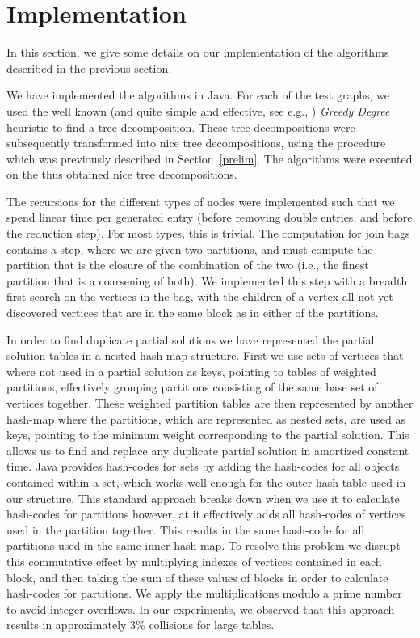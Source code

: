 \documentclass{llncs}
\begin{document}
\section{Implementation}
\label{section:experiments}
In this section, we give some details on our implementation of the algorithms described in the previous section.

We have implemented the algorithms in Java. For each of the test graphs, we used the well known (and quite simple and effective, see e.g., \cite{BodlaenderK10}) {\em Greedy Degree} 
heuristic to find a tree decomposition. These tree decompositions were subsequently transformed into nice tree decompositions,
using the procedure which was previously described in Section~\ref{prelim}. The algorithms were executed on the thus obtained nice tree decompositions.

The recursions for the different types of nodes were implemented such that we spend linear time per generated entry (before removing double entries, and before
the reduction step). For most types, this is trivial. The computation for join bags contains a step, where we are given two partitions, and must compute
the partition that is the closure of the combination of the two (i.e., the finest partition that is a coarsening of both). We implemented this step with a
breadth first search on the vertices in the bag, with the children of a vertex  all not yet discovered vertices that are in the same block as  in either of the
partitions.

In order to find duplicate partial solutions we have represented the partial solution tables in a nested hash-map structure.
First we use sets of vertices that where not used in a partial solution as keys, pointing to tables of weighted partitions, effectively grouping partitions consisting of the same base set of vertices together.
These weighted partition tables are then represented by another hash-map where the partitions, which are represented as nested sets, are used as keys, pointing to the minimum weight corresponding to the partial solution. This allows us to find and replace any duplicate partial solution in amortized constant time. Java provides hash-codes for sets by adding the hash-codes for all objects contained within a set, which works well enough for the outer hash-table used in our structure. This standard approach breaks down when we use it to calculate hash-codes for partitions however, at it effectively adds all hash-codes of vertices used in the partition together. This results in the same hash-code for all partitions used in the same inner hash-map. 
To resolve this problem we disrupt this commutative effect by multiplying indexes of vertices contained in each block, and then taking the sum of these values of
blocks in order to calculate hash-codes for partitions. We apply the multiplications modulo a prime number to avoid integer overflows.
In our experiments, we observed that this approach results in approximately 3\% collisions for large tables.
\end{document}

